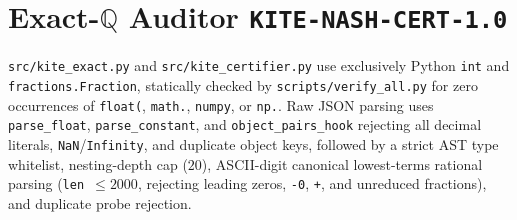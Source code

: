 \documentclass[10pt,twocolumn]{article}
\newcommand{\QQ}{\mathbb{Q}}
\begin{document}
\section{Exact-\texorpdfstring{$\QQ$}{Q} Auditor \texorpdfstring{\texttt{KITE-NASH-CERT-1.0}}{KITE-NASH-CERT-1.0}}\label{sec:certifier}
\texttt{src/kite\_exact.py} and \texttt{src/kite\_certifier.py} use exclusively Python \texttt{int} and \texttt{fractions.Fraction}, statically checked by \texttt{scripts/verify\_all.py} for zero occurrences of \texttt{float(}, \texttt{math.}, \texttt{numpy}, or \texttt{np.}. Raw JSON parsing uses \texttt{parse\_float}, \texttt{parse\_constant}, and \texttt{object\_pairs\_hook} rejecting all decimal literals, \texttt{NaN}/\texttt{Infinity}, and duplicate object keys, followed by a strict AST type whitelist, nesting-depth cap ($20$), ASCII-digit canonical lowest-terms rational parsing (\texttt{len $\le 2000$}, rejecting leading zeros, \texttt{-0}, \texttt{+}, and unreduced fractions), and duplicate probe rejection.
\end{document}
